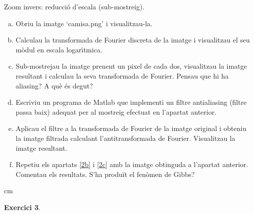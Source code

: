 \documentclass{article}
\begin{document}
Zoom invers: reducci\'o d'escala (sub-mostreig).
\begin{enumerate}[a)]
\item \label{2a} Obriu la imatge `camisa.png' i visualitzau-la.

\item \label{2b} Calculau la transformada de Fourier discreta de
la imatge i visualitzau el seu m\`odul en escala logar\'\i tmica.

\item \label{2c} Sub-mostrejau la imatge prenent un pixel de cada
dos, visualitzau la imatge resultant i calculau la seva
transformada de Fourier. Pensau que hi ha aliasing? A qu\`e \'es
degut?

\item \label{2d} Escriviu un programa de Matlab que implementi un
filtre antialiasing (filtre passa baix) adequat per al mostreig
efectuat en l'apartat anterior.

\item \label{2e} Aplicau el filtre a la transformada de Fourier de
la imatge original i obteniu la imatge filtrada calculant
l'antitransformada de Fourier. Visualitzau la imatge resultant.

\item \label{2f}  Repetiu els apartats \ref{2b} i \ref{2c} amb la
imatge obtinguda a l'apartat anterior. Comentau els resultats.
S'ha produ\"it el fen\`omen de Gibbs?

\end{enumerate}

 cm


\noindent \textbf{Exercici 3}. \label{ex3}
\newline
\end{document}
